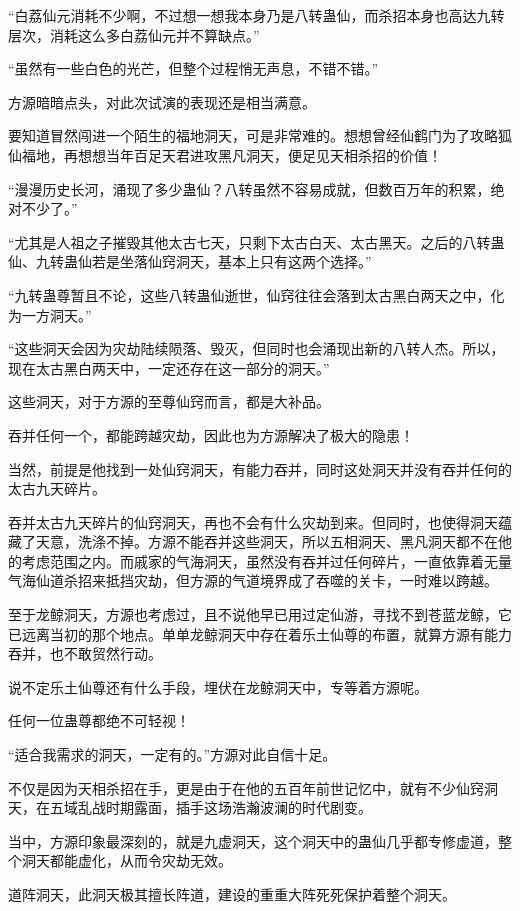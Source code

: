 \begin{this_body}
“白荔仙元消耗不少啊，不过想一想我本身乃是八转蛊仙，而杀招本身也高达九转层次，消耗这么多白荔仙元并不算缺点。”

“虽然有一些白色的光芒，但整个过程悄无声息，不错不错。”

方源暗暗点头，对此次试演的表现还是相当满意。

要知道冒然闯进一个陌生的福地洞天，可是非常难的。想想曾经仙鹤门为了攻略狐仙福地，再想想当年百足天君进攻黑凡洞天，便足见天相杀招的价值！

“漫漫历史长河，涌现了多少蛊仙？八转虽然不容易成就，但数百万年的积累，绝对不少了。”

“尤其是人祖之子摧毁其他太古七天，只剩下太古白天、太古黑天。之后的八转蛊仙、九转蛊仙若是坐落仙窍洞天，基本上只有这两个选择。”

“九转蛊尊暂且不论，这些八转蛊仙逝世，仙窍往往会落到太古黑白两天之中，化为一方洞天。”

“这些洞天会因为灾劫陆续陨落、毁灭，但同时也会涌现出新的八转人杰。所以，现在太古黑白两天中，一定还存在这一部分的洞天。”

这些洞天，对于方源的至尊仙窍而言，都是大补品。

吞并任何一个，都能跨越灾劫，因此也为方源解决了极大的隐患！

当然，前提是他找到一处仙窍洞天，有能力吞并，同时这处洞天并没有吞并任何的太古九天碎片。

吞并太古九天碎片的仙窍洞天，再也不会有什么灾劫到来。但同时，也使得洞天蕴藏了天意，洗涤不掉。方源不能吞并这些洞天，所以五相洞天、黑凡洞天都不在他的考虑范围之内。而戚家的气海洞天，虽然没有吞并过任何碎片，一直依靠着无量气海仙道杀招来抵挡灾劫，但方源的气道境界成了吞噬的关卡，一时难以跨越。

至于龙鲸洞天，方源也考虑过，且不说他早已用过定仙游，寻找不到苍蓝龙鲸，它已远离当初的那个地点。单单龙鲸洞天中存在着乐土仙尊的布置，就算方源有能力吞并，也不敢贸然行动。

说不定乐土仙尊还有什么手段，埋伏在龙鲸洞天中，专等着方源呢。

任何一位蛊尊都绝不可轻视！

“适合我需求的洞天，一定有的。”方源对此自信十足。

不仅是因为天相杀招在手，更是由于在他的五百年前世记忆中，就有不少仙窍洞天，在五域乱战时期露面，插手这场浩瀚波澜的时代剧变。

当中，方源印象最深刻的，就是九虚洞天，这个洞天中的蛊仙几乎都专修虚道，整个洞天都能虚化，从而令灾劫无效。

道阵洞天，此洞天极其擅长阵道，建设的重重大阵死死保护着整个洞天。


\end{this_body}

